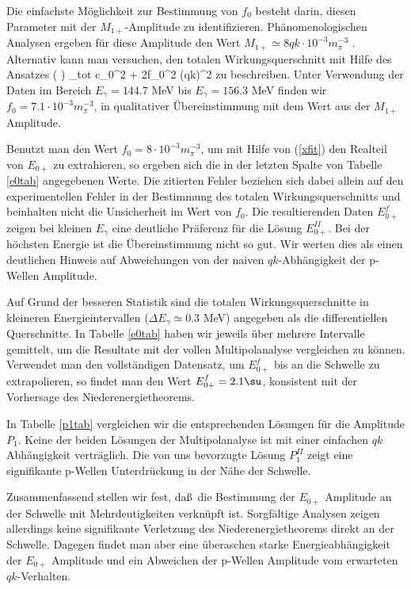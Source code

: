 Die einfachste M\"oglichkeit zur Bestimmung von $f_0$ besteht darin, 
diesen Parameter mit der $M_{1+}$-Amplitude zu identifizieren. 
Ph\"anomenologischen Analysen ergeben f\"ur diese Amplitude den Wert
$M_{1+}\simeq 8qk \cdot 10^{-3} m_\pi^{-3}$ \cite{NSV74}.
Alternativ kann man versuchen, den totalen Wirkungsquerschnitt mit Hilfe des 
Ansatzes    
\be
  \left(  \right) \sigma_{tot}\simeq
 c_0^2 + 2f_0^2 (qk)^2 
\ee
zu beschreiben. Unter Verwendung der Daten im
Bereich $E_\gamma=144.7$ MeV bis $E_\gamma=156.3$ MeV finden 
wir $f_0=7.1\cdot 10^{-3}m_\pi^{-3}$, in qualitativer \"Ubereinstimmung
mit dem Wert aus der $M_{1+}$ Amplitude. 
 
Benutzt man den Wert $f_0=8\cdot 10^{-3}m_\pi^{-3}$, um mit Hilfe von 
(\ref{xfit}) den Realteil von $E_{0+}$ zu extrahieren, so ergeben sich die 
in der letzten Spalte von Tabelle \ref{e0tab} angegebenen Werte. Die zitierten
Fehler beziehen sich dabei allein auf den experimentellen Fehler in der
Bestimmung des totalen Wirkungsquerschnitts und beinhalten nicht die 
Unsicherheit im Wert von $f_0$. Die resultierenden Daten $E_{0+}^f$
zeigen bei kleinen $E_\gamma$ eine deutliche Pr\"aferenz f\"ur die L\"osung
$E_{0+}^{II}$. Bei der h\"ochsten Energie ist die \"Ubereinstimmung 
nicht so gut. Wir werten dies als einen deutlichen Hinweis auf 
Abweichungen von der naiven $qk$-Abh\"angigkeit der p-Wellen Amplitude. 

Auf Grund der besseren Statistik sind die totalen Wirkungsquerschnitte
in kleineren Energieintervallen ($\Delta E_\gamma \simeq 0.3$ MeV)
angegeben als die differentiellen Querschnitte. In Tabelle \ref{e0tab}
haben wir jeweils \"uber mehrere Intervalle gemittelt, um die Resultate
mit der vollen Multipolanalyse vergleichen zu k\"onnen. Verwendet man
den vollst\"andigen Datensatz, um $E_{0+}^f$ bis an die Schwelle zu 
extrapolieren, so findet man den Wert $E_{0+}^f = 2.1 \su$, konsistent mit der
Vorhersage des Niederenergietheorems.   


In Tabelle \ref{p1tab} vergleichen wir die entsprechenden L\"osungen
f\"ur die Amplitude $P_1$. Keine der beiden L\"osungen der
Multipolanalyse ist mit einer einfachen $qk$ Abh\"angigkeit
ver\-tr\"ag\-lich. Die von uns bevorzugte L\"osung $P_1^{II}$ zeigt
eine signifikante p-Wellen Unterdr\"uckung in der N\"ahe der
Schwelle.

Zusammenfassend stellen wir fest, da\ss\ die Bestimmung der $E_{0+}$
Amplitude an der Schwelle mit Mehrdeutigkeiten verkn\"upft ist.
Sorgf\"altige Analysen zeigen allerdings keine signifikante Verletzung
des Niederenergietheorems direkt an der Schwelle. 
Dagegen findet man aber eine \"uberaschen starke
Energieabh\"angigkeit der $E_{0+}$ Amplitude und ein Abweichen
der p-Wellen Amplitude vom erwarteten $qk$-Verhalten.
